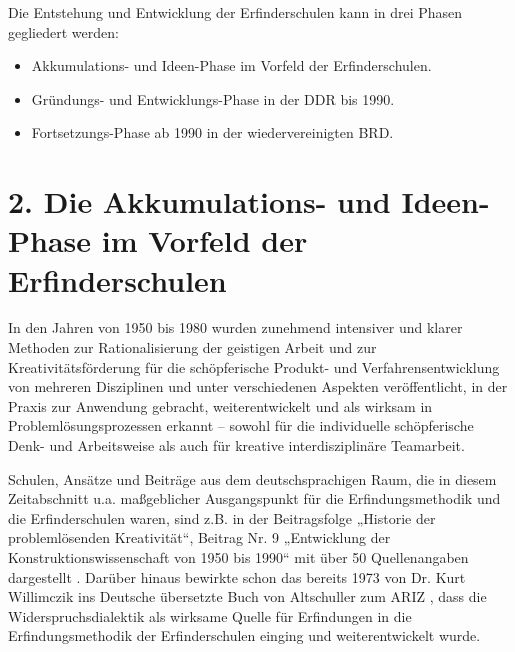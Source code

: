 \documentclass[11pt,a4paper]{article}
\begin{document}
Die Entstehung und Entwicklung der Erfinderschulen kann in drei Phasen
gegliedert werden:
\begin{itemize}
\item Akkumulations- und Ideen-Phase im Vorfeld der Erfinderschulen.
\item Gründungs- und Entwicklungs-Phase in der DDR bis 1990.
\item Fortsetzungs-Phase ab 1990 in der wiedervereinigten BRD.
\end{itemize}

\section*{2. Die Akkumulations- und Ideen-Phase im Vorfeld der
  Erfinderschulen} 
 
In den Jahren von 1950 bis 1980 wurden zunehmend intensiver und klarer
Methoden zur Rationalisierung der geistigen Arbeit und zur
Kreativitätsförderung für die schöpferische Produkt- und Verfahrensentwicklung
von mehreren Disziplinen und unter verschiedenen Aspekten ver\-öffent\-licht,
in der Praxis zur Anwendung gebracht, weiterentwickelt und als wirksam in
Problem\-lösungs\-prozessen erkannt -- sowohl für die individuelle
schöpferische Denk- und Arbeitsweise als auch für kreative interdisziplinäre
Teamarbeit.

Schulen, Ansätze und Beiträge aus dem deutschsprachigen Raum, die in diesem
Zeitabschnitt u.a. maßgeblicher Ausgangspunkt für die Erfindungsmethodik und
die Erfinderschulen waren, sind z.B. in der Beitragsfolge „Historie der
problemlösenden Kreativität“, Beitrag Nr. 9 „Entwicklung der
Konstruktionswissenschaft von 1950 bis 1990“ mit über 50 Quellenangaben
dargestellt \cite{1}. Darüber hinaus bewirkte schon das bereits 1973 von
Dr. Kurt Willimczik ins Deutsche übersetzte Buch von Altschuller zum ARIZ
\cite{3.1}, dass die Widerspruchsdialektik als wirksame Quelle für Erfindungen
in die Erfindungsmethodik der Erfinderschulen einging und weiterentwickelt
wurde.
\end{document}
